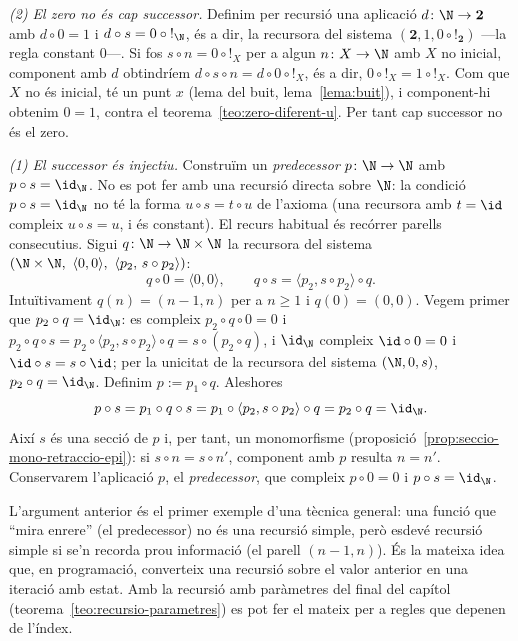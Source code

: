\begin{prova}
\emph{(2) El zero no és cap successor.} Definim per recursió una aplicació
\(d\colon\N\to\mathbf2\) amb \(d\circ 0=1\) i
\(d\circ s=0\circ{!}_\N\), és a dir, la recursora del sistema
\((\mathbf2,1,0\circ{!}_{\mathbf2})\) ---la regla constant \(0\)---. Si fos
\(s\circ n=0\circ{!}_X\) per a algun \(n\colon X\to\N\) amb \(X\) no
inicial, component amb \(d\) obtindríem
\(d\circ s\circ n=d\circ 0\circ{!}_X\), és a dir,
\(0\circ{!}_X=1\circ{!}_X\). Com que \(X\) no és inicial, té un punt
\(x\) (lema del buit, lema~\ref{lema:buit}), i component-hi obtenim
\(0=1\), contra el teorema~\ref{teo:zero-diferent-u}. Per tant cap
successor no és el zero.

\emph{(1) El successor és injectiu.} Construïm un \emph{predecessor}
\(p\colon\N\to\N\) amb \(p\circ s=\id_\N\). No es pot fer amb una recursió
directa sobre \(\N\): la condició \(p\circ s=\id_\N\) no té la forma
\(u\circ s=t\circ u\) de l'axioma (una recursora amb \(t=\id\) compleix
\(u\circ s=u\), i és constant). El recurs habitual és recórrer parells
consecutius. Sigui \(q\colon\N\to\N\times\N\) la recursora del sistema
\((\N\times\N,\ \langle0,0\rangle,\ \langle p_2,\,s\circ p_2\rangle)\):
\[
q\circ0=\langle0,0\rangle,
\qquad
q\circ s=\langle p_2,s\circ p_2\rangle\circ q .
\]
Intuïtivament \(q(n)=(n-1,n)\) per a \(n\ge1\) i \(q(0)=(0,0)\). Vegem
primer que \(p_2\circ q=\id_\N\): es compleix
\(p_2\circ q\circ0=0\) i
\(p_2\circ q\circ s=p_2\circ\langle p_2,s\circ p_2\rangle\circ q
=s\circ(p_2\circ q)\), i \(\id_\N\) compleix \(\id\circ0=0\) i
\(\id\circ s=s\circ\id\); per la unicitat de la recursora del sistema
\((\N,0,s)\), \(p_2\circ q=\id_\N\). Definim \(p:=p_1\circ q\). Aleshores
\[
p\circ s=p_1\circ q\circ s=p_1\circ\langle p_2,s\circ p_2\rangle\circ q
=p_2\circ q=\id_\N .
\]
Així \(s\) és una secció de \(p\) i, per tant, un monomorfisme
(proposició~\ref{prop:seccio-mono-retraccio-epi}): si
\(s\circ n=s\circ n'\), component amb \(p\) resulta \(n=n'\). Conservarem
l'aplicació \(p\), el \emph{predecessor}, que compleix \(p\circ0=0\) i
\(p\circ s=\id_\N\).
\end{prova}

\begin{observacio}\label{obs:predecessor-parell}
L'argument anterior és el primer exemple d'una tècnica general: una
funció que \enquote{mira enrere} (el predecessor) no és una recursió
simple, però esdevé recursió simple si se'n recorda prou informació (el
parell \((n-1,n)\)). És la mateixa idea que, en programació, converteix
una recursió sobre el valor anterior en una iteració amb estat. Amb la
recursió amb paràmetres del final del capítol
(teorema~\ref{teo:recursio-parametres}) es pot fer el mateix per a
regles que depenen de l'índex.
\end{observacio}

